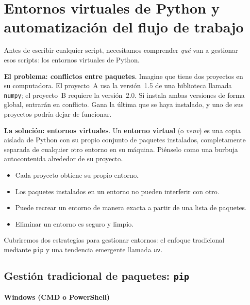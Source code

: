 \chapter{Entornos virtuales de Python y automatización del flujo de trabajo}
\label{ch:python-environments}

Antes de escribir cualquier script, necesitamos comprender \emph{qué} van a
gestionar esos scripts: los entornos virtuales de Python.

\textbf{El problema: conflictos entre paquetes}.
Imagine que tiene dos proyectos en su computadora. El proyecto~A usa la
versión~1.5 de una biblioteca llamada \texttt{numpy}; el proyecto~B requiere
la versión~2.0. Si instala ambas versiones de forma global, entrarán en
conflicto. Gana la última que se haya instalado, y uno de sus proyectos
podría dejar de funcionar.

\textbf{La solución: entornos virtuales}.
Un \textbf{entorno virtual} (o \emph{venv}) es una copia aislada de Python
con su propio conjunto de paquetes instalados, completamente separada de
cualquier otro entorno en su máquina. Piénselo como una burbuja autocontenida
alrededor de su proyecto.

\begin{itemize}
  \item Cada proyecto obtiene su propio entorno.
  \item Los paquetes instalados en un entorno no pueden interferir con otro.
  \item Puede recrear un entorno de manera exacta a partir de una lista de paquetes.
  \item Eliminar un entorno es seguro y limpio.
\end{itemize}

Cubriremos dos estrategias para gestionar entornos: el enfoque tradicional
mediante \texttt{pip} y una tendencia emergente llamada \texttt{uv}.

\section{Gestión tradicional de paquetes: \texttt{pip}}
\label{sec:venvs}
\subsubsection{Windows (CMD o PowerShell)}

